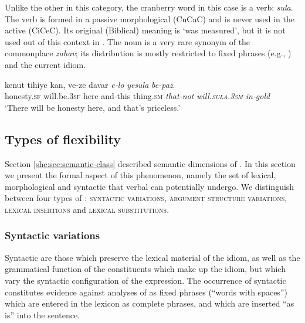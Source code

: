 \documentclass[output=paper]{langsci/langscibook}
\begin{document}
 Unlike the other  in this category, the cranberry word in this case is a verb: \textit{sula}. The verb is formed in a passive morphological  (CuCaC) and is never used in the active  (CiCeC). Its original (Biblical) meaning is `was measured', but it is not used out of this context in . The noun  is a very rare synonym of the commonplace \textit{zahav}; its distribution is mostly restricted to fixed phrases (e.g., ) and the current idiom.

	\ea\label{she:yesula-canon}
    	\gll kenut tihiye kan, ve-ze davar \textit{{\shin}e-lo} \textit{yesula} \textit{be-paz}.\\
    	   honesty.\textsc{sf} will.be.\textsc{3sf} here and-this thing.\textsc{sm} \textit{that-not} \textit{will.\textsc{sula}.\textsc{3sm}} \textit{in-gold}\\
    	\glt `There will be honesty here, and that's priceless.'
	\z


\subsection{Types of flexibility}

Section \ref{she:sec:semantic-class} described semantic dimensions of . In this section we present the formal aspect of this phenomenon, namely the set of lexical, morphological and syntactic  that verbal  can potentially undergo. We distinguish between four types of : {\scshape syntactic variations}, {\scshape argument structure variations}, {\scshape lexical insertions} and {\scshape lexical substitutions}.

\subsubsection{Syntactic variations}\largerpage
\label{she:sec:syn-var}
Syntactic  are those which preserve the lexical material of the idiom, as well as the grammatical function of the constituents which make up the idiom, but which vary the syntactic configuration of the expression. The occurrence of syntactic  constitutes evidence against analyses of  as fixed phrases (``words with spaces'') which are entered in the lexicon as complete phrases, and which are inserted ``as is'' into the sentence.
\end{document}
